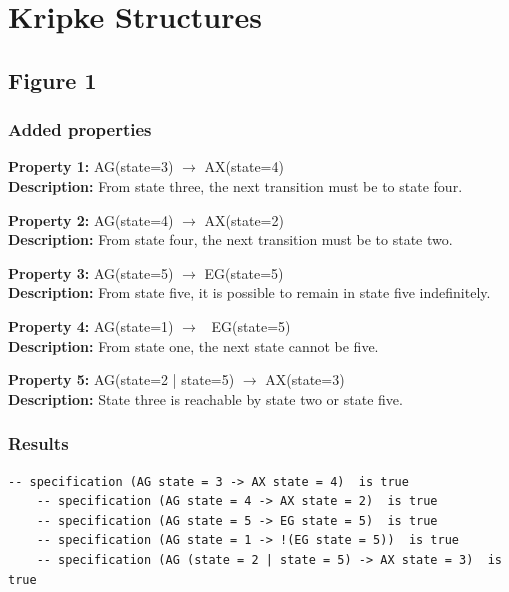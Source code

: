 \documentclass[11pt]{article}
\begin{document}
\section{Kripke Structures} 

\subsection{Figure 1}
	\subsubsection{Added properties}
	
		\textbf{Property 1:} 	AG(state=3) $\to$ AX(state=4) 	\\	
		\textbf{Description:} From state three, the next transition must be to state four. \\
		\vspace{12pt}
		
		\textbf{Property 2:} AG(state=4) $\to$ AX(state=2)\\ 
		\textbf{Description:} From state four, the next transition must be to state two. \\
		\vspace{12pt}
		
		\textbf{Property 3:} 	AG(state=5) $\to$ EG(state=5)\\ 
		\textbf{Description:} From state five, it is possible to remain in state five indefinitely. \\
		\vspace{12pt}
		
		\textbf{Property 4:} AG(state=1) $\to$ ~EG(state=5) \\
		\textbf{Description:} From state one, the next state cannot be five.\\
		\vspace{12pt}
		
		\textbf{Property 5:} AG(state=2 | state=5) $\to$ AX(state=3)  \\
		\textbf{Description:} State three is reachable by state two or state five.\\
	
	
	\subsubsection{Results}
	
	\begin{lstlisting}[caption=NuSMV Kripke Diagram Output, label=p2_1_out]	
	-- specification (AG state = 3 -> AX state = 4)  is true
	-- specification (AG state = 4 -> AX state = 2)  is true
	-- specification (AG state = 5 -> EG state = 5)  is true
	-- specification (AG state = 1 -> !(EG state = 5))  is true
	-- specification (AG (state = 2 | state = 5) -> AX state = 3)  is true
	\end{lstlisting}
	
\end{document}
